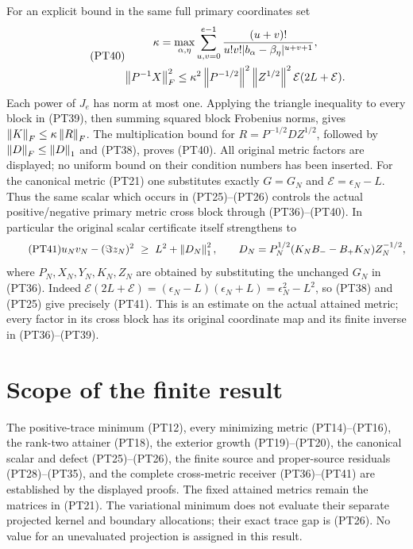 For an explicit bound in the same full primary coordinates set
\begin{equation}\tag{PT40}
 \begin{gathered}
 \kappa=\max_{\alpha,\eta}
       \sum_{u,v=0}^{e-1}
       \frac{(u+v)!}{u!v!|b_\alpha-\beta_\eta|^{u+v+1}},\\
 \left\lVert P^{-1}X\right\rVert_F^2
 \le\kappa^2\left\lVert P^{-1/2}\right\rVert^2\left\lVert Z^{1/2}\right\rVert^2
                  \mathcal E(2L+\mathcal E).
 \end{gathered}
\end{equation}
Each power of \(J_e\) has norm at most one. Applying the triangle
inequality to every block in (PT39), then summing squared block
Frobenius norms, gives \(\left\lVert K\right\rVert_F\le\kappa\left\lVert R\right\rVert_F\).
The multiplication bound for \(R=P^{-1/2}DZ^{1/2}\), followed
by \(\left\lVert D\right\rVert_F\le\left\lVert D\right\rVert_1\) and (PT38), proves (PT40).
All original metric factors are displayed; no uniform bound on
their condition numbers has been inserted.
For the canonical metric (PT21) one substitutes exactly
\(G=G_N\) and \(\mathcal E=\epsilon_N-L\). Thus the same
scalar which occurs in (PT25)--(PT26) controls the actual
positive/negative primary metric cross block through (PT36)--(PT40).
In particular the original scalar certificate itself strengthens to
\begin{equation}\tag{PT41}
 u_Nv_N-(\Im z_N)^2\ \ge\ L^2+\left\lVert D_N\right\rVert_1^2,
 \qquad
 D_N=P_N^{1/2}(K_NB_--B_+K_N)Z_N^{-1/2},
\end{equation}
where \(P_N,X_N,Y_N,K_N,Z_N\) are obtained by substituting
the unchanged \(G_N\) in (PT36). Indeed
\(\mathcal E(2L+\mathcal E)=(\epsilon_N-L)
(\epsilon_N+L)=\epsilon_N^2-L^2\), so (PT38) and (PT25)
give precisely (PT41). This is an estimate on the actual attained
metric; every factor in its cross block has its original coordinate
map and its finite inverse in (PT36)--(PT39).

\section{Scope of the finite result}

The positive-trace minimum (PT12), every minimizing metric
(PT14)--(PT16), the rank-two attainer (PT18), the exterior growth
(PT19)--(PT20), the canonical scalar and defect (PT25)--(PT26),
the finite source and proper-source residuals (PT28)--(PT35),
and the complete cross-metric receiver (PT36)--(PT41)
are established by the displayed proofs. The fixed attained
metrics remain the matrices in (PT21). The variational minimum
does not evaluate their separate projected kernel and boundary
allocations; their exact trace gap is (PT26). No value for an
unevaluated projection is assigned in this result.



